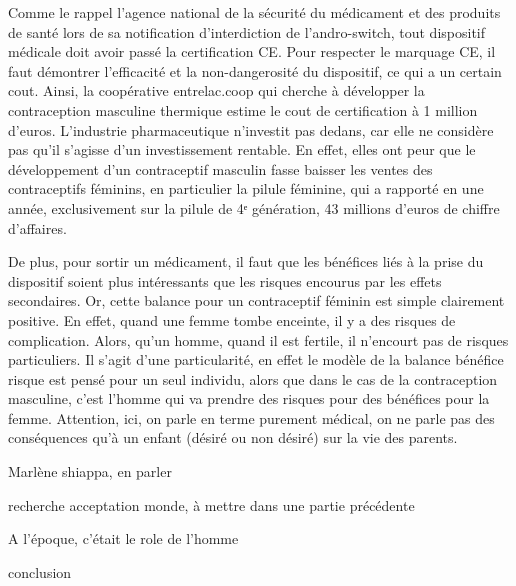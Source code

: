 \documentclass[12pt,a4paper]{report}
\begin{document}
Comme le rappel l'agence national de la sécurité du médicament et des produits de santé lors de sa notification d'interdiction de l'andro-switch, tout dispositif médicale doit avoir passé la certification CE. \cite{ActualiteAnneauContraceptif}
Pour respecter le marquage CE, il faut démontrer l'efficacité et la non-dangerosité du dispositif, ce qui a un certain cout. Ainsi, la coopérative entrelac.coop qui cherche à développer la contraception masculine thermique estime le cout de certification à 1 million d'euros. \cite{AccueilEntrelacCoop}
L'industrie pharmaceutique n'investit pas dedans, car elle ne considère pas qu'il s'agisse d'un investissement rentable. En effet, elles ont peur que le développement d'un contraceptif masculin fasse baisser les ventes des contraceptifs féminins, \cite{heloiserambertPourquoiPiluleMasculine2023}\cite{ENQUETEPourquoiDeveloppement2023} en particulier la pilule féminine, qui a rapporté en une année, exclusivement sur la pilule de 4ᵉ génération, 43 millions d'euros de chiffre d'affaires. \cite{PilulesContraceptivesMarche2013}

De plus, pour sortir un médicament, il faut que les bénéfices liés à la prise du dispositif soient plus intéressants que les risques encourus par les effets secondaires. Or, cette balance pour un contraceptif féminin est simple clairement positive. En effet, quand une femme tombe enceinte, il y a des risques de complication. Alors, qu'un homme, quand il est fertile, il n'encourt pas de risques particuliers. Il s'agit d'une particularité, en effet le modèle de la balance bénéfice risque est pensé pour un seul individu, alors que dans le cas de la contraception masculine, c'est l'homme qui va prendre des risques pour des bénéfices pour la femme. \cite{heloiserambertPourquoiPiluleMasculine2023} Attention, ici, on parle en terme purement médical, on ne parle pas des conséquences qu'à un enfant (désiré ou non désiré) sur la vie des parents.



Marlène shiappa, en parler



recherche acceptation monde, à mettre dans une partie précédente

A l'époque, c'était le role de l'homme 

conclusion


\listoffigures
\end{document}
